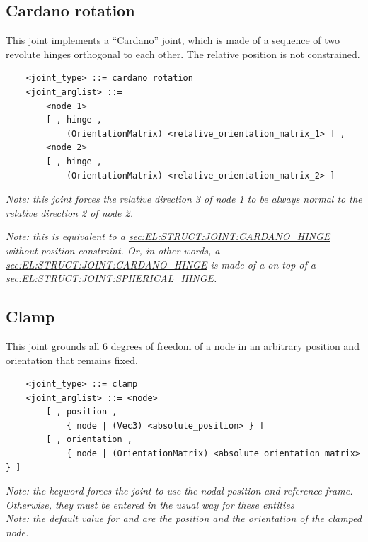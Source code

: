 \subsection{Cardano rotation}
\label{sec:EL:STRUCT:JOINT:CARDANO_ROTATION}
This joint implements a ``Cardano'' joint, which is made of a sequence
of two revolute hinges orthogonal to each other.
The relative position is not constrained.
\begin{verbatim}
    <joint_type> ::= cardano rotation
    <joint_arglist> ::= 
        <node_1>
        [ , hinge , 
            (OrientationMatrix) <relative_orientation_matrix_1> ] ,
        <node_2>
        [ , hinge , 
            (OrientationMatrix) <relative_orientation_matrix_2> ]
\end{verbatim}
{\em
    Note: this joint forces the relative direction 3 of node 1 to be always 
    normal to the relative direction 2 of node 2.
}

\emph{Note: this is equivalent to a
\hyperref{\kw{cardano hinge}}{\kw{cardano hinge} (see Section~}{)}{sec:EL:STRUCT:JOINT:CARDANO_HINGE}
without position constraint.
Or, in other words, a 
\hyperref{\kw{cardano hinge}}{\kw{cardano hinge} (see Section~}{)}{sec:EL:STRUCT:JOINT:CARDANO_HINGE}
is made of a  on top of a 
\hyperref{\kw{spherical hinge}}{\kw{spherical hinge} (see Section~}{)}{sec:EL:STRUCT:JOINT:SPHERICAL_HINGE}.
}



\subsection{Clamp}
This joint grounds all 6 degrees of freedom of a node
in an arbitrary position and orientation that remains fixed.
\begin{verbatim}
    <joint_type> ::= clamp 
    <joint_arglist> ::= <node>
        [ , position ,
            { node | (Vec3) <absolute_position> } ]
        [ , orientation ,
            { node | (OrientationMatrix) <absolute_orientation_matrix> } ]
\end{verbatim}
\emph{Note: the keyword  forces the joint to use
the nodal position and reference frame. Otherwise, they must be entered
in the usual way for these entities} \\
\emph{Note: the default value for  and 
are the position and the orientation of the clamped node.}

